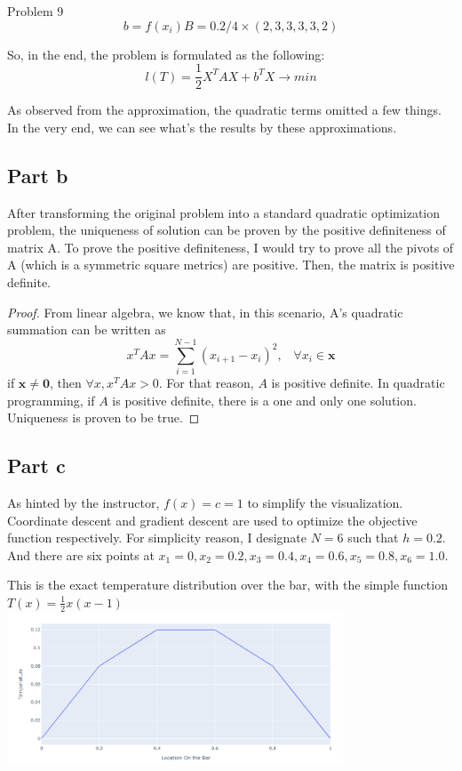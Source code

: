 \documentclass[10pt]{article}
\begin{document}
\begin{section}{Problem 9}
\[b = f(x_i)B = 0.2/4 \times (2, 3, 3, 3, 3, 2) \]

So, in the end, the problem is formulated as the following: 
\[l(T) = \frac{1}{2} X^T A X + b^T X \to min\]

As observed from the approximation, the quadratic terms omitted a few things. In the very end, we can see what's the results by these approximations. 
\subsection{Part b}
After transforming the original problem into a standard quadratic optimization problem, the uniqueness of solution can be proven by the positive definiteness of matrix A. To prove the positive definiteness, I would try to prove all the pivots of A (which is a symmetric square metrics) are positive. Then, the matrix is positive definite. 
\begin{proof}
	From linear algebra, we know that, in this scenario, A's quadratic summation can be written as
	\[x^T A x = \sum_{i=1}^{N-1}(x_{i+1} - x_{i})^2, \;\;\; \forall x_i \in \mathbf{x}\]
	if $\mathbf{x} \neq \mathbf{0}$, then $ \forall x, x^T A x >0$. For that reason, $A$ is positive definite. In quadratic programming, if $A$ is positive definite, there is a one and only one solution. Uniqueness is proven to be true. 
\end{proof}

\subsection{Part c}
As hinted by the instructor, $f(x) = c = 1$ to simplify the visualization. Coordinate descent and gradient descent are used to optimize the objective function respectively. For simplicity reason, I designate $N = 6$ such that $h = 0.2$. And there are six points at $x_1 = 0, x_2 = 0.2, x_3 = 0.4, x_4 = 0.6, x_5 = 0.8, x_6 = 1.0$. 

This is the exact temperature distribution over the bar, with the simple function $T(x) = \frac{1}{2}x(x-1)$\\
\includegraphics[width=10cm]{img/problem9_plt1.png}


\end{section}
\end{document}
